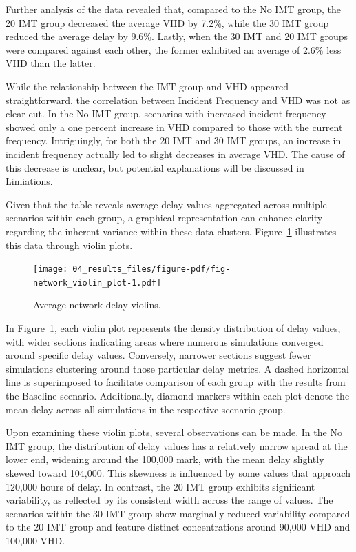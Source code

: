 \documentclass[fancy, oneside, mastersfancy, ms]{byuthesis}
\begin{document}
Further analysis of the data revealed that, compared to the No IMT
group, the 20 IMT group decreased the average VHD by 7.2\%, while the 30
IMT group reduced the average delay by 9.6\%. Lastly, when the 30 IMT
and 20 IMT groups were compared against each other, the former exhibited
an average of 2.6\% less VHD than the latter.

While the relationship between the IMT group and VHD appeared
straightforward, the correlation between Incident Frequency and VHD was
not as clear-cut. In the No IMT group, scenarios with increased incident
frequency showed only a one percent increase in VHD compared to those
with the current frequency. Intriguingly, for both the 20 IMT and 30 IMT
groups, an increase in incident frequency actually led to slight
decreases in average VHD. The cause of this decrease is unclear, but
potential explanations will be discussed in
\protect\hyperlink{sec-limitations}{Limiations}.

Given that the table reveals average delay values aggregated across
multiple scenarios within each group, a graphical representation can
enhance clarity regarding the inherent variance within these data
clusters. Figure~\ref{fig-network_violin_plot} illustrates this data
through violin plots.

\begin{figure}

{\centering \texttt{[image: 04\_results\_files/figure-pdf/fig-network\_violin\_plot-1.pdf]}

}

\caption{\label{fig-network_violin_plot}Average network delay violins.}

\end{figure}

In Figure~\ref{fig-network_violin_plot}, each violin plot represents the
density distribution of delay values, with wider sections indicating
areas where numerous simulations converged around specific delay values.
Conversely, narrower sections suggest fewer simulations clustering
around those particular delay metrics. A dashed horizontal line is
superimposed to facilitate comparison of each group with the results
from the Baseline scenario. Additionally, diamond markers within each
plot denote the mean delay across all simulations in the respective
scenario group.

Upon examining these violin plots, several observations can be made. In
the No IMT group, the distribution of delay values has a relatively
narrow spread at the lower end, widening around the 100,000 mark, with
the mean delay slightly skewed toward 104,000. This skewness is
influenced by some values that approach 120,000 hours of delay. In
contrast, the 20 IMT group exhibits significant variability, as
reflected by its consistent width across the range of values. The
scenarios within the 30 IMT group show marginally reduced variability
compared to the 20 IMT group and feature distinct concentrations around
90,000 VHD and 100,000 VHD.
\end{document}

